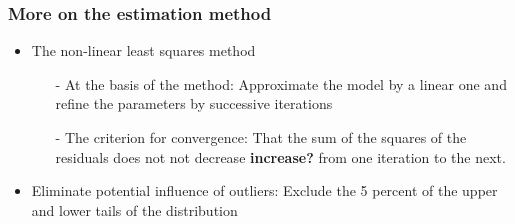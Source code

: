 \documentclass[10 pt,Helvetica, french]{beamer}
\begin{document}
\begin{frame}[label=app_method]
\frametitle{More on the estimation method}
\begin{itemize}
\item The non-linear least squares method \vspace{0.1cm}
\begin{itemize}
\item[-] At the basis of the method: Approximate the model by a linear one and refine the parameters by successive iterations \vspace{0.1cm}
\item[-] The criterion for convergence: That the sum of the squares of the residuals does not not decrease \textbf{increase?} from one iteration to the next. \vspace{0.1cm}
\end{itemize}
\item Eliminate potential influence of outliers: Exclude the 5 percent of the upper and lower tails of the distribution \vspace{0.1cm}

\end{itemize}
\hyperlink{slide_method}{}
\end{frame}
\end{document}
